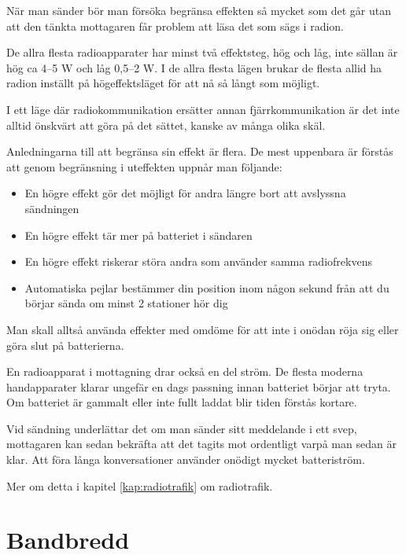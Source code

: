 När man sänder bör man försöka begränsa effekten så mycket som det går utan att den tänkta mottagaren får problem att läsa det som sägs i radion. 

De allra flesta radioapparater har minst två effektsteg, hög och låg, inte sällan är hög ca 4--5 W och låg 0,5--2 W. I de allra flesta lägen brukar de flesta allid ha radion inställt på högeffektsläget för att nå så långt som möjligt.

I ett läge där radiokommunikation ersätter annan fjärrkommunikation är det inte alltid önskvärt att göra på det sättet, kanske av många olika skäl.

Anledningarna till att begränsa sin effekt är flera. De mest uppenbara är förstås att genom begränsning i uteffekten uppnår man följande:

\begin{itemize}
	\item En högre effekt gör det möjligt för andra längre bort att avslyssna sändningen
	\item En högre effekt tär mer på batteriet i sändaren
	\item En högre effekt riskerar störa andra som använder samma radiofrekvens
	\item Automatiska pejlar bestämmer din position inom någon sekund från att du börjar sända om minst 2 stationer hör dig
\end{itemize}

Man skall alltså använda effekter med omdöme för att inte i onödan röja sig eller göra slut på batterierna.

En radioapparat i mottagning drar också en del ström. De flesta moderna handapparater klarar ungefär en dags passning innan batteriet börjar att tryta. Om batteriet är gammalt eller inte fullt laddat blir tiden förstås kortare.

Vid sändning underlättar det om man sänder sitt meddelande i ett svep, mottagaren kan sedan bekräfta att det tagits mot ordentligt varpå man sedan är klar. Att föra långa konversationer använder onödigt mycket batteriström.

Mer om detta i kapitel  \ref{kap:radiotrafik} om radiotrafik.



\section{Bandbredd}


